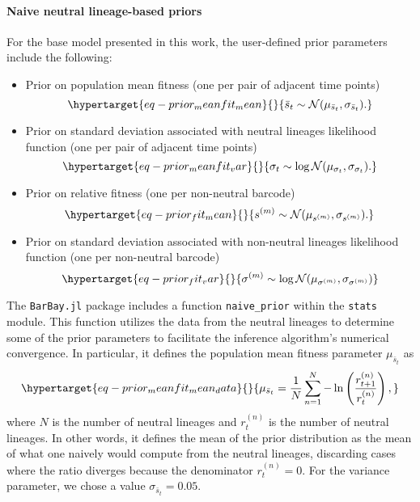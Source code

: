\documentclass[
]{scrartcl}
\let\oldparagraph\paragraph
\renewcommand{\paragraph}[1]{\oldparagraph{#1}\mbox{}}
\begin{document}
\begin{refsegment}
\hypertarget{naive-neutral-lineage-based-priors}{%
\paragraph{Naive neutral lineage-based
priors}\label{naive-neutral-lineage-based-priors}}

For the base model presented in this work, the user-defined prior
parameters include the following:

\begin{itemize}
\item
  Prior on population mean fitness (one per pair of adjacent time
  points) \begin{equation}\protect\hypertarget{eq-prior_meanfit_mean}{}{
  \bar{s}_t \sim \mathcal{N}(\mu_{\bar{s}_t}, \sigma_{{\bar{s}_t}}).
  }\label{eq-prior_meanfit_mean}\end{equation}
\item
  Prior on standard deviation associated with neutral lineages
  likelihood function (one per pair of adjacent time points)
  \begin{equation}\protect\hypertarget{eq-prior_meanfit_var}{}{
  \sigma_t \sim \log\mathcal{N}(\mu_{\sigma_t}, \sigma_{\sigma_t}).
  }\label{eq-prior_meanfit_var}\end{equation}
\item
  Prior on relative fitness (one per non-neutral barcode)
  \begin{equation}\protect\hypertarget{eq-prior_fit_mean}{}{
  s^{(m)} \sim \mathcal{N}(\mu_{s^{(m)}}, \sigma_{s^{(m)}}).
  }\label{eq-prior_fit_mean}\end{equation}
\item
  Prior on standard deviation associated with non-neutral lineages
  likelihood function (one per non-neutral barcode)
  \begin{equation}\protect\hypertarget{eq-prior_fit_var}{}{
  \sigma^{(m)} \sim \log\mathcal{N}(\mu_{\sigma^{(m)}}, \sigma_{\sigma^{(m)}})
  }\label{eq-prior_fit_var}\end{equation}
\end{itemize}

The \texttt{BarBay.jl} package includes a function \texttt{naive\_prior}
within the \texttt{stats} module. This function utilizes the data from
the neutral lineages to determine some of the prior parameters to
facilitate the inference algorithm's numerical convergence. In
particular, it defines the population mean fitness parameter
\(\mu_{\bar{s}_t}\) as
\begin{equation}\protect\hypertarget{eq-prior_meanfit_mean_data}{}{
\mu_{\bar{s}_t} = \frac{1}{N} \sum_{n=1}^N 
-\ln\left( \frac{r_{t+1}^{(n)}}{r_t^{(n)}} \right),
}\label{eq-prior_meanfit_mean_data}\end{equation} where \(N\) is the
number of neutral lineages and \(r_t^{(n)}\) is the number of neutral
lineages. In other words, it defines the mean of the prior distribution
as the mean of what one naively would compute from the neutral lineages,
discarding cases where the ratio diverges because the denominator
\(r_t^{(n)} = 0\). For the variance parameter, we chose a value
\(\sigma_{\bar{s}_t} = 0.05\).


\end{refsegment}
\end{document}
